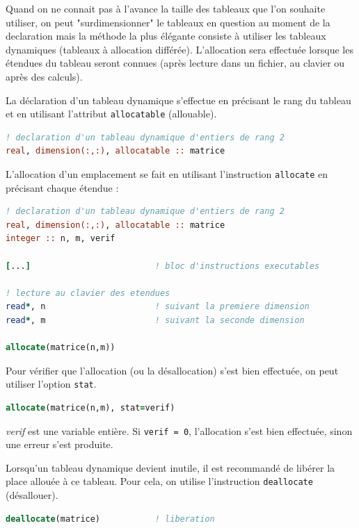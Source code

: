 \documentclass[a4paper,twoside]{article}
\begin{document}
Quand on ne connait pas à l'avance la taille des tableaux que l'on souhaite utiliser, on peut "surdimensionner" le tableaux en question au moment de la declaration mais la méthode la plus élégante consiste à utiliser les tableaux dynamiques (tableaux à allocation différée). L'allocation sera effectuée lorsque les étendues du tableau seront connues (après lecture dans un fichier, au clavier ou après des calculs).

\bigskip

La déclaration d'un tableau dynamique s'effectue en précisant le 
rang du tableau et en utilisant l'attribut \texttt{allocatable} 
(allouable). 
\begin{lstlisting}[language=Fortran]
! declaration d'un tableau dynamique d'entiers de rang 2 
real, dimension(:,:), allocatable :: matrice
\end{lstlisting}

\bigskip

L'allocation d'un emplacement se fait en utilisant l'instruction \texttt{allocate} en précisant chaque étendue :
\begin{lstlisting}[language=Fortran]
! declaration d'un tableau dynamique d'entiers de rang 2 
real, dimension(:,:), allocatable :: matrice
integer :: n, m, verif

[...]                         ! bloc d'instructions executables

! lecture au clavier des etendues
read*, n                      ! suivant la premiere dimension
read*, m                      ! suivant la seconde dimension

allocate(matrice(n,m))
\end{lstlisting}

\begin{remarque}
Pour vérifier que l'allocation (ou la désallocation) s'est bien effectuée, on peut utiliser l'option \texttt{stat}. 
\begin{lstlisting}[language=Fortran]
allocate(matrice(n,m), stat=verif)
\end{lstlisting}
\emph{verif} est une variable entière. Si \texttt{verif = 0}, l'allocation s'est bien effectuée, sinon une erreur s'est produite. 
\end{remarque}

Lorsqu'un tableau dynamique devient inutile, il est recommandé de libérer la place allouée à ce tableau. Pour cela, on utilise l'instruction \texttt{deallocate} (désallouer).
\begin{lstlisting}[language=Fortran]
deallocate(matrice)           ! liberation
\end{lstlisting}
\end{document}
